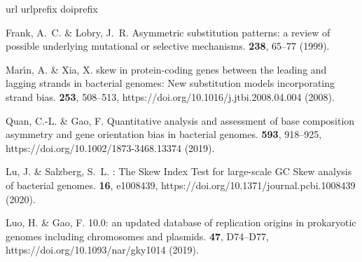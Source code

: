 \documentclass[fleqn,10pt]{wlscirep}
\begin{document}
\begin{thebibliography}{10}
\expandafter\ifx\csname url\endcsname\relax
  \def\url#1{\texttt{#1}}\fi
\expandafter\ifx\csname urlprefix\endcsname\relax\def\urlprefix{URL }\fi
\expandafter\ifx\csname doiprefix\endcsname\relax\def\doiprefix{DOI: }\fi
\providecommand{\bibinfo}[2]{#2}
\providecommand{\eprint}[2][]{\url{#2}}

\bibinfo{author}{Frank, A.~C.} \& \bibinfo{author}{Lobry, J.~R.}
\newblock \bibinfo{journal}{\bibinfo{title}{Asymmetric substitution patterns: a
  review of possible underlying mutational or selective mechanisms.}}
 \textbf{\bibinfo{volume}{238}},
  \bibinfo{pages}{65--77} (\bibinfo{year}{1999}).

\bibinfo{author}{Mar{\'{\i}}n, A.} \& \bibinfo{author}{Xia, X.}
\newblock \bibinfo{journal}{\bibinfo{title}{{GC} skew in protein-coding genes
  between the leading and lagging strands in bacterial genomes: New
  substitution models incorporating strand bias}}.
  \textbf{\bibinfo{volume}{253}}, \bibinfo{pages}{508--513},
  https://doi.org/10.1016/j.jtbi.2008.04.004 (\bibinfo{year}{2008}).

\bibinfo{author}{Quan, C.-L.} \& \bibinfo{author}{Gao, F.}
\newblock \bibinfo{journal}{\bibinfo{title}{Quantitative analysis and
  assessment of base composition asymmetry and gene orientation bias in
  bacterial genomes}}.
  \textbf{\bibinfo{volume}{593}}, \bibinfo{pages}{918--925},
  https://doi.org/10.1002/1873-3468.13374 (\bibinfo{year}{2019}).

\bibinfo{author}{Lu, J.} \& \bibinfo{author}{Salzberg, S.~L.}
\newblock \bibinfo{journal}{\bibinfo{title}{{SkewIT}: {The} {Skew} {Index}
  {Test} for large-scale {GC} {Skew} analysis of bacterial genomes}}.
  \textbf{\bibinfo{volume}{16}}, \bibinfo{pages}{e1008439},
  https://doi.org/10.1371/journal.pcbi.1008439 (\bibinfo{year}{2020}).

\bibinfo{author}{Luo, H.} \& \bibinfo{author}{Gao, F.}
\newblock \bibinfo{journal}{\bibinfo{title}{{DoriC} 10.0: an updated database
  of replication origins in prokaryotic genomes including chromosomes and
  plasmids}}.
  \textbf{\bibinfo{volume}{47}}, \bibinfo{pages}{D74--D77},
  https://doi.org/10.1093/nar/gky1014 (\bibinfo{year}{2019}).


\end{thebibliography}
\end{document}
